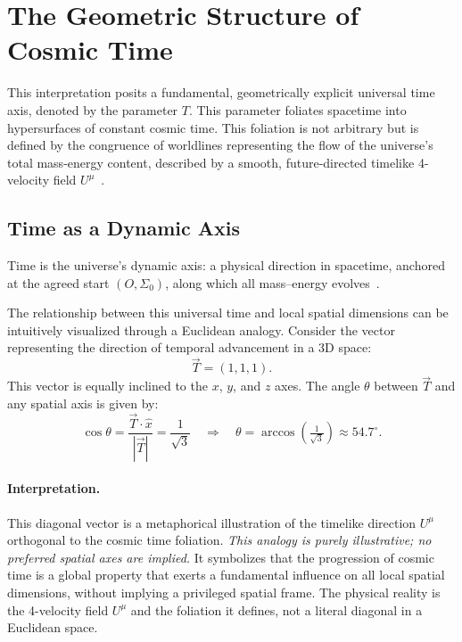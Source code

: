 \documentclass[12pt]{article}
\theoremstyle{plain} %
\begin{document}
\section*{The Geometric Structure of Cosmic Time}
This interpretation posits a fundamental, geometrically explicit universal time axis, denoted by the parameter $T$. This parameter foliates spacetime into hypersurfaces of constant cosmic time. This foliation is not arbitrary but is defined by the congruence of worldlines representing the flow of the universe's total mass-energy content, described by a smooth, future-directed timelike 4-velocity field $U^\mu$~\cite{Carroll2004}.

\subsection*{Time as a Dynamic Axis}
Time is the universe’s dynamic axis: a physical direction in spacetime, anchored at the agreed start $(O,\Sigma_0)$, along which all mass–energy evolves~\cite{Rindler2006}.

\medskip
\noindent The relationship between this universal time and local spatial dimensions can be intuitively visualized through a Euclidean analogy. Consider the vector representing the direction of temporal advancement in a 3D space:
\[
\vec{T} = (1,1,1).
\]
This vector is equally inclined to the $x$, $y$, and $z$ axes. The angle $\theta$ between $\vec{T}$ and any spatial axis is given by:
\[
\cos \theta = \frac{\vec{T} \cdot \hat{x}}{|\vec{T}|} = \frac{1}{\sqrt{3}} \quad \Rightarrow \quad \theta = \arccos\left(\tfrac{1}{\sqrt{3}}\right) \approx 54.7^\circ.
\]

\paragraph{Interpretation.}
This diagonal vector is a metaphorical illustration of the timelike direction $U^\mu$ orthogonal to the cosmic time foliation. \emph{This analogy is purely illustrative; no preferred spatial axes are implied.} It symbolizes that the progression of cosmic time is a global property that exerts a fundamental influence on all local spatial dimensions, without implying a privileged spatial frame. The physical reality is the 4-velocity field $U^\mu$ and the foliation it defines, not a literal diagonal in a Euclidean space.
\end{document}
